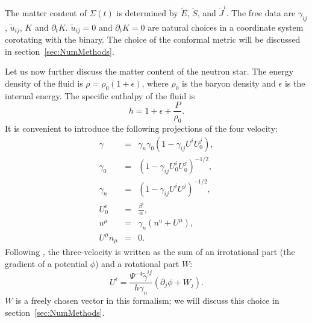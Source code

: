 The matter content of $\Sigma(t)$ is determined by $\tilde{E}$,
$\tilde{S}$, and $\tilde{J}^i$. The free data are $\gamma_{ij}$,
$\tilde{u}_{ij}$, $K$ and $\partial_t K$. $\tilde{u}_{ij}=0$ and
$\partial_t K=0$ are natural choices in a coordinate system corotating
with the binary. The
choice of the conformal metric will be discussed in section~\ref{sec:NumMethods}.

Let us now further discuss the matter content of the neutron star. The
energy density of the fluid is $\rho=\rho_0\left(1+\epsilon\right)$,
where $\rho_0$ is the baryon density and $\epsilon$ is the internal
energy. The specific enthalpy of the fluid is
\begin{equation}
h=1+\epsilon+\frac{P}{\rho_0}.
\end{equation}
It is convenient to introduce the following projections of the four
velocity:
\begin{eqnarray}
\gamma &=& \gamma_n\gamma_0\left(1-\gamma_{ij}U^iU^j_0\right), \\
\gamma_0 &=& \left(1 - \gamma_{ij}U^i_0U^j_0\right)^{-1/2}, \\
\gamma_n &=& \left(1 - \gamma_{ij}U^iU^j\right)^{-1/2}, \\
U^i_0 &=& \frac{\beta^i}{\alpha}, \\
u^{\mu} &=& \gamma_n\left(n^u+U^\mu\right), \\
U^{\mu}n_{\mu}&=&0.
\end{eqnarray}
Following \cite{Tichy:2011gw}, the three-velocity is written as the sum
of an irrotational part (the gradient of a potential $\phi$) and a
rotational part $W$:
\begin{equation}
U^i =
\frac{\Psi^{-4}\tilde{\gamma}^{ij}}{h\gamma_n}\left(\partial_j\phi+W_j\right).
\end{equation}
$W$ is a freely chosen vector in this formalism; we will discuss this choice in section~\ref{sec:NumMethods}.

